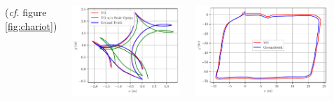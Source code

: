 \documentclass[25pt, a0paper, portrait]{tikzposter}
\begin{document}
\begin{columns}
{    \lipsum[5][]
}


{
    \lipsum[8][1] (\textit{cf.} figure \ref{fig:chariot}) 
    
    \begin{minipage}{0.5\linewidth}
        \vspace{1.2cm}
        \begin{tikzfigure}
                \centering
                \includegraphics[width=.9\linewidth]{images/trajectory_chariot1.pdf}
            \label{fig:chariot}
        \end{tikzfigure}
        
    \end{minipage}
    \begin{minipage}{0.5\linewidth}
    \vspace{2.8cm}
        \begin{tikzfigure}
            \centering
            \includegraphics[width=\linewidth]{images/trajectory_square.pdf}
            \label{fig:square}
        \end{tikzfigure}
    \end{minipage}
    \vspace{0.5cm}
    
    \lipsum[7]
}

{
    \lipsum[1][1] \lipsum[1][2]
}
      
\end{columns}
\end{document}
